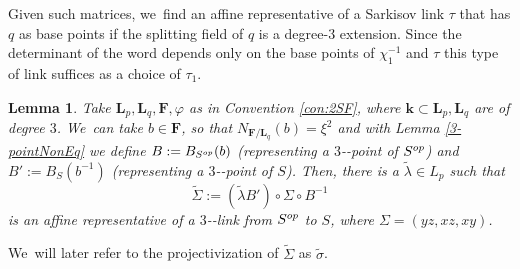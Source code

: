 \documentclass[10pt,a4paper]{amsart}
\providecommand{\nobreakdash}{\nobreak\hbox{-}}
\newcommand{\op}{\textup{op}}
\newtheorem{lemma}[theorem]{Lemma}
\theoremstyle{definition}
\newcommand{\kk}{{\boldsymbol{k}}}
\newcommand{\FF}{{\boldsymbol{F}}}
\newcommand{\LL}{{\boldsymbol{L}}}
\begin{document}
Given such matrices, we~find an affine representative of a Sarkisov link $\tau$ that has $q$ as base points if the splitting field of $q$ is a degree-$3$ extension. Since the determinant of the word depends only on the base points of $\chi_1^{-1}$ and $\tau$ this type of link suffices as a choice of $\tau_1$.

\begin{lemma} \label{BB'}
Take $\LL_p, \LL_q, \FF, \varphi$ as in Convention \ref{con:2SF}, where $\kk \subset \LL_p, \LL_q$ are of degree $3$. We~can take $b \in \FF$, so that $N_{\FF / \LL_q}(b) = \xi^{2}$ and with Lemma \ref{3-pointNonEq} we define $B := B_{S^{\op}}(b)$ (representing a $3$\nobreakdash-point of $S^{\op}$) and $B':=B_S(b^{-1})$ (representing a $3$\nobreakdash-point of $S$).
Then, there is a $\tilde \lambda \in L_p$ such that
\[
\tilde \Sigma := (\tilde \lambda B') \circ \Sigma \circ B^{-1}
\]
is an affine representative of a $3$\nobreakdash-link from $S^{\op}$ to $S$, where $\Sigma = (yz,xz,xy)$.
\end{lemma}

We~will later refer to the projectivization of $\tilde \Sigma$ as $\tilde \sigma$.
\end{document}
